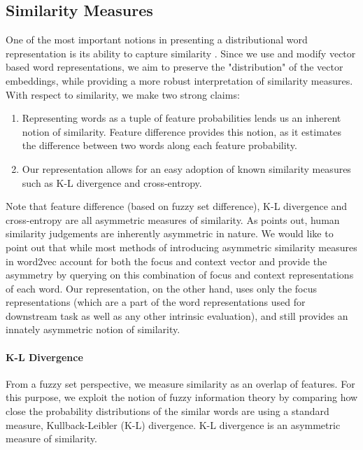 \documentclass[11pt]{book}
\newcommand{\citep}[1]{\cite{#1}}
\newcommand{\citet}[1]{\cite{#1}}
\begin{document}
\subsection{Similarity Measures} \label{ssec: similarity math} One of the most
important notions in presenting a distributional word representation is its
ability to capture similarity \citep{van2006finding}. Since we use and modify
vector based word representations, we aim to preserve the "distribution" of the
vector embeddings, while providing a more robust interpretation of similarity
measures. With respect to similarity, we make two strong claims:
\begin{enumerate} \item Representing words as a tuple of feature probabilities
lends us an inherent notion of similarity. Feature difference provides this
notion, as it estimates the difference between two words along each feature
probability.  \item Our representation allows for an easy adoption of known
similarity measures such as K-L divergence and cross-entropy.  \end{enumerate}

Note that feature difference (based on fuzzy set difference), K-L divergence
and cross-entropy are all asymmetric measures of similarity. As
\citet{nematzadeh2017evaluating} points out, human similarity judgements are
inherently asymmetric in nature. We would like to point out that while most
methods of introducing asymmetric similarity measures in word2vec account for
both the focus and context vector \citet{asr2018querying} and provide the
asymmetry by querying on this combination of focus and context representations
of each word. Our representation, on the other hand, uses only the focus
representations (which are a part of the word representations used for
downstream task as well as any other intrinsic evaluation), and still provides
an innately asymmetric notion of similarity.

\paragraph{K-L Divergence} From a fuzzy set perspective, we measure similarity
as an overlap of features. For this purpose, we exploit the notion of fuzzy
information theory by comparing how close the probability distributions of the
similar words are using a standard measure, Kullback-Leibler (K-L) divergence.
K-L divergence is an asymmetric measure of similarity.
\end{document}
